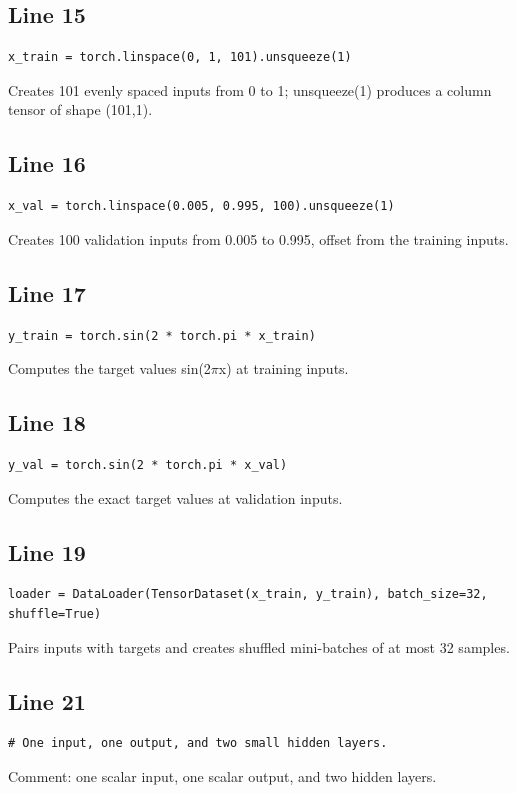 \documentclass[11pt,a4paper]{article}
\begin{document}
\subsection*{Line 15}
\begin{lstlisting}
x_train = torch.linspace(0, 1, 101).unsqueeze(1)
\end{lstlisting}
Creates 101 evenly spaced inputs from 0 to 1; unsqueeze(1) produces a column tensor of shape (101,1).

\subsection*{Line 16}
\begin{lstlisting}
x_val = torch.linspace(0.005, 0.995, 100).unsqueeze(1)
\end{lstlisting}
Creates 100 validation inputs from 0.005 to 0.995, offset from the training inputs.

\subsection*{Line 17}
\begin{lstlisting}
y_train = torch.sin(2 * torch.pi * x_train)
\end{lstlisting}
Computes the target values sin(2$\pi$x) at training inputs.

\subsection*{Line 18}
\begin{lstlisting}
y_val = torch.sin(2 * torch.pi * x_val)
\end{lstlisting}
Computes the exact target values at validation inputs.

\subsection*{Line 19}
\begin{lstlisting}
loader = DataLoader(TensorDataset(x_train, y_train), batch_size=32, shuffle=True)
\end{lstlisting}
Pairs inputs with targets and creates shuffled mini-batches of at most 32 samples.

\subsection*{Line 21}
\begin{lstlisting}
# One input, one output, and two small hidden layers.
\end{lstlisting}
Comment: one scalar input, one scalar output, and two hidden layers.
\end{document}
